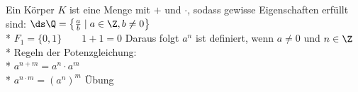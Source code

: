 %
\wdh
Ein Körper $K$ ist eine Menge mit $+$ und $·$, sodass gewisse Eigenschaften erfüllt sind:
\bsp
$\ds\Q = \left\{\frac{a}{b} \mid a \in \Z, b \neq 0\right\}$\\*
$F_1 = \{0, 1\} \qquad 1 + 1 = 0$
Daraus folgt $a^n$ ist definiert, wenn $a \neq 0$ und $n \in \Z$\\*
Regeln der Potenzgleichung:\\*
$a^{n+m} = a^n \cdot a^m$\\*
$a^{n \cdot m} = (a^{n})^m$
\bew
Übung

